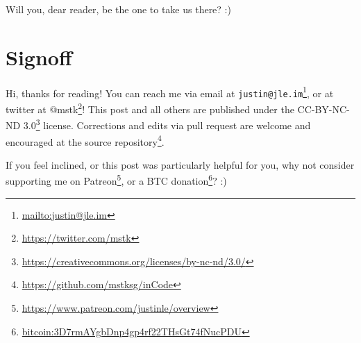 \documentclass[]{article}
\renewcommand{\href}[2]{#2\footnote{\url{#1}}}
\begin{document}
Will you, dear reader, be the one to take us there? :)

\hypertarget{signoff}{%
\section{Signoff}\label{signoff}}

Hi, thanks for reading! You can reach me via email at
\href{mailto:justin@jle.im}{\nolinkurl{justin@jle.im}}, or at twitter at
\href{https://twitter.com/mstk}{@mstk}! This post and all others are published
under the \href{https://creativecommons.org/licenses/by-nc-nd/3.0/}{CC-BY-NC-ND
3.0} license. Corrections and edits via pull request are welcome and encouraged
at \href{https://github.com/mstksg/inCode}{the source repository}.

If you feel inclined, or this post was particularly helpful for you, why not
consider \href{https://www.patreon.com/justinle/overview}{supporting me on
Patreon}, or a \href{bitcoin:3D7rmAYgbDnp4gp4rf22THsGt74fNucPDU}{BTC donation}?
:)
\end{document}
